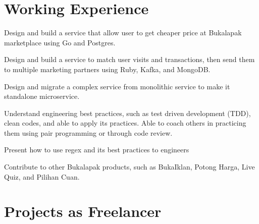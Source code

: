 \documentclass[letterpaper]{deedy-resume} %
\begin{document}
\hfill
\begin{minipage}[t]{0.66\textwidth} %


\section{Working Experience}

\vspace{\topsep} %
\begin{tightitemize}
\item Design and build a service that allow user to get cheaper price at Bukalapak marketplace using Go and Postgres.
\item Design and build a service to match user visits and transactions, then send them to multiple marketing partners using Ruby, Kafka, and MongoDB.
\item Design and migrate a complex service from monolithic service to make it standalone microservice.
\item Understand engineering best practices, such as test driven development (TDD), clean codes, and able to apply its practices. Able to coach others in practicing them using pair programming or through code review.
\item Present how to use regex and its best practices to engineers
\item Contribute to other Bukalapak products, such as BukaIklan, Potong Harga, Live Quiz, and Pilihan Cuan.
\end{tightitemize}
\sectionspace


\section{Projects as Freelancer}


\end{minipage}
\end{document}
